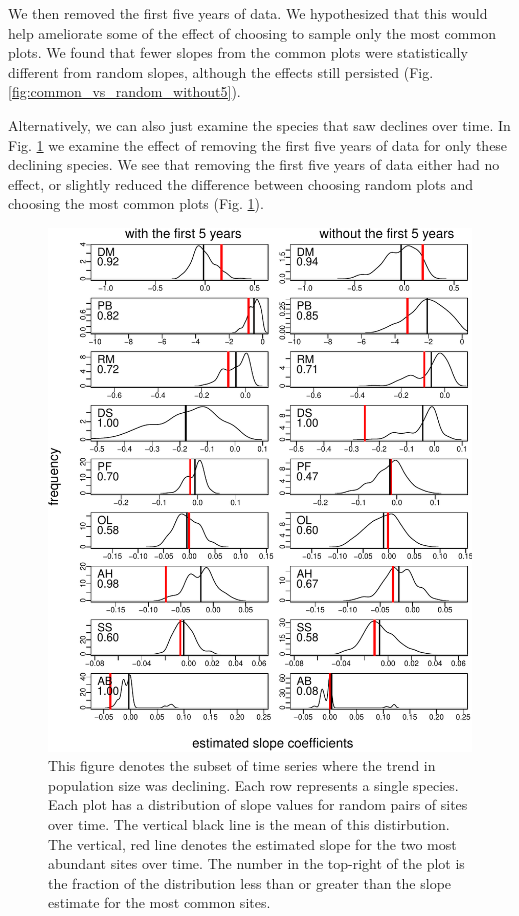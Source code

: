 \documentclass[]{article}
\begin{document}
We then removed the first five years of data. We hypothesized that this
would help ameliorate some of the effect of choosing to sample only the
most common plots. We found that fewer slopes from the common plots were
statistically different from random slopes, although the effects still
persisted (Fig. \ref{fig:common_vs_random_without5}).

Alternatively, we can also just examine the species that saw declines
over time. In Fig. \ref{fig:declining_species} we examine the effect of
removing the first five years of data for only these declining species.
We see that removing the first five years of data either had no effect,
or slightly reduced the difference between choosing random plots and
choosing the most common plots (Fig. \ref{fig:declining_species}).

\begin{figure}[htbp]
\centering
\includegraphics{Empirical_Investigation_files/figure-latex/unnamed-chunk-4-1.pdf}
\caption{This figure denotes the subset of time series where the trend
in population size was declining. Each row represents a single species.
Each plot has a distribution of slope values for random pairs of sites
over time. The vertical black line is the mean of this distirbution. The
vertical, red line denotes the estimated slope for the two most abundant
sites over time. The number in the top-right of the plot is the fraction
of the distribution less than or greater than the slope estimate for the
most common sites.\label{fig:declining_species}}
\end{figure}
\end{document}
